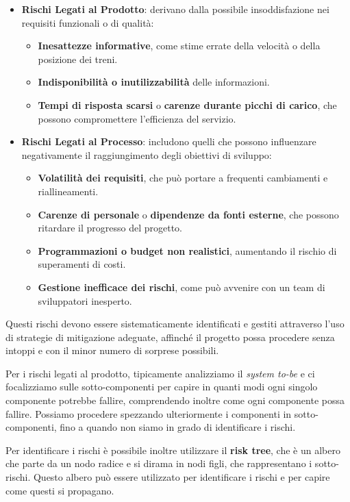 \begin{itemize}
    \item \textbf{Rischi Legati al Prodotto}:
    derivano dalla possibile insoddisfazione nei
    requisiti funzionali o di qualità:
    \begin{itemize}
        \item \textbf{Inesattezze informative}, come stime errate della velocità o della
        posizione dei treni.
        \item \textbf{Indisponibilità o inutilizzabilità} delle informazioni.
        \item \textbf{Tempi di risposta scarsi} o \textbf{carenze durante picchi di carico},
        che possono compromettere l'efficienza del servizio.
    \end{itemize}
    \item \textbf{Rischi Legati al Processo}:
   includono quelli che possono influenzare negativamente il raggiungimento
   degli obiettivi di sviluppo:
    \begin{itemize}
        \item \textbf{Volatilità dei requisiti}, che può portare a frequenti cambiamenti
        e riallineamenti.
        \item \textbf{Carenze di personale} o \textbf{dipendenze da fonti esterne}, che
        possono ritardare il progresso del progetto.
        \item \textbf{Programmazioni o budget non realistici}, aumentando il rischio di
        superamenti di costi.
        \item \textbf{Gestione inefficace dei rischi}, come può avvenire con un team di
        sviluppatori inesperto.
    \end{itemize}
\end{itemize}

Questi rischi devono essere sistematicamente identificati e gestiti attraverso l'uso
di strategie di mitigazione adeguate, affinché il progetto possa procedere senza
intoppi e con il minor numero di sorprese possibili.

Per i rischi legati al prodotto, tipicamente analizziamo il \textit{system to-be} e
ci focalizziamo sulle sotto-componenti per capire in quanti modi ogni singolo componente
potrebbe fallire, comprendendo inoltre come ogni componente possa fallire.
Possiamo procedere spezzando ulteriormente i componenti in sotto-componenti, fino a
quando non siamo in grado di identificare i rischi.

Per identificare i rischi è possibile inoltre utilizzare il \textbf{risk tree}, che è
un albero che parte da un nodo radice e si dirama in nodi figli, che rappresentano
i sotto-rischi. Questo albero può essere utilizzato per identificare i rischi e
per capire come questi si propagano.

